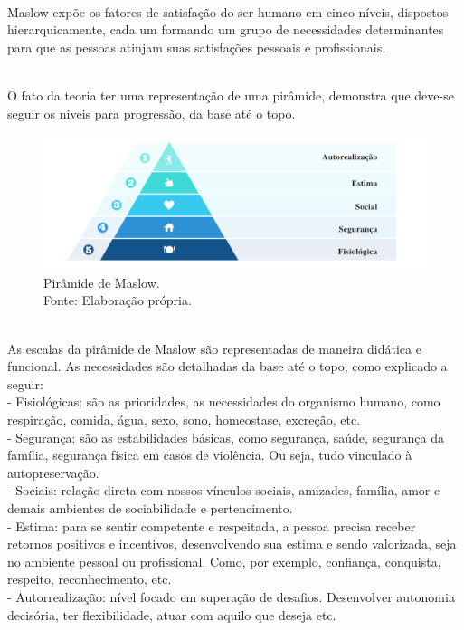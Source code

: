 \documentclass[a4paper, 10pt]{article}
\begin{document}
    \\
    Maslow expõe os fatores de satisfação do ser humano em cinco níveis, dispostos hierarquicamente, cada um formando um grupo de necessidades determinantes para que as pessoas atinjam suas satisfações pessoais e profissionais.
     
     \\
     
     O fato da teoria ter uma representação de uma pirâmide, demonstra que deve-se seguir os níveis para progressão, da base até o topo.

    \begin{figure}[1h]
	\centering 
	\includegraphics[scale=0.41]{figs/Maslow.png}
	\caption{Pirâmide de Maslow.\\Fonte: Elaboração própria.}
	\label{Fonte: Elaboração própria}
	\end{figure}
	
	\\
	
	As escalas da pirâmide de Maslow são representadas de maneira didática e funcional. As necessidades são detalhadas da base até o topo, como  explicado a seguir:
	\\
 - Fisiológicas: são as prioridades, as necessidades do organismo humano, como respiração, comida, água, sexo, sono, homeostase, excreção, etc.
 \\
- Segurança: são as estabilidades básicas, como segurança, saúde, segurança da família, segurança física em casos de violência. Ou seja, tudo vinculado à autopreservação.
\\
- Sociais: relação direta com nossos vínculos sociais, amizades, família, amor e demais ambientes de sociabilidade e pertencimento.
\\
- Estima: para se sentir competente e respeitada, a pessoa precisa receber retornos positivos e incentivos, desenvolvendo sua estima e sendo valorizada, seja no ambiente pessoal ou profissional. Como, por exemplo, confiança, conquista, respeito, reconhecimento, etc.
\\
- Autorrealização: nível focado em superação de desafios. Desenvolver autonomia decisória, ter flexibilidade, atuar com aquilo que deseja etc. 
\end{document}
